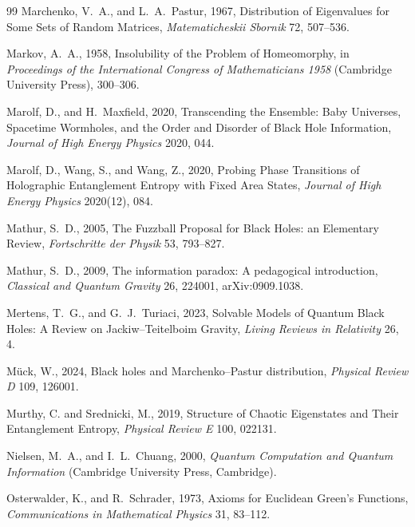 \documentclass[11pt,letterpaper]{article}
\theoremstyle{plain}
\theoremstyle{definition}
\theoremstyle{remark}
\begin{document}
\begin{thebibliography}{99}
Marchenko, V.~A., and L.~A.~Pastur, 1967, Distribution of Eigenvalues for Some Sets of Random Matrices, \textit{Matematicheskii Sbornik} 72, 507--536.

Markov, A.~A., 1958, Insolubility of the Problem of Homeomorphy, in \textit{Proceedings of the International Congress of Mathematicians 1958} (Cambridge University Press), 300--306.

Marolf, D., and H.~Maxfield, 2020, Transcending the Ensemble: Baby Universes, Spacetime Wormholes, and the Order and Disorder of Black Hole Information, \textit{Journal of High Energy Physics} 2020, 044.

Marolf, D., Wang, S., and Wang, Z., 2020, Probing Phase Transitions of Holographic Entanglement Entropy with Fixed Area States, \textit{Journal of High Energy Physics} 2020(12), 084.

Mathur, S.~D., 2005, The Fuzzball Proposal for Black Holes: an Elementary Review, \textit{Fortschritte der Physik} 53, 793--827.

Mathur, S.~D., 2009, The information paradox: A pedagogical introduction,
\textit{Classical and Quantum Gravity} 26, 224001, arXiv:0909.1038.

Mertens, T.~G., and G.~J.~Turiaci, 2023, Solvable Models of Quantum Black Holes: A Review on Jackiw--Teitelboim Gravity, \textit{Living Reviews in Relativity} 26, 4.

M\"uck, W., 2024, Black holes and Marchenko--Pastur distribution, \textit{Physical Review D} 109, 126001.

Murthy, C. and Srednicki, M., 2019, Structure of Chaotic Eigenstates and Their Entanglement Entropy, \textit{Physical Review E} 100, 022131.

Nielsen, M.~A., and I.~L.~Chuang, 2000, \textit{Quantum Computation and Quantum Information} (Cambridge University Press, Cambridge).

Osterwalder, K., and R.~Schrader, 1973, Axioms for Euclidean Green's Functions, \textit{Communications in Mathematical Physics} 31, 83--112.


\end{thebibliography}
\end{document}
